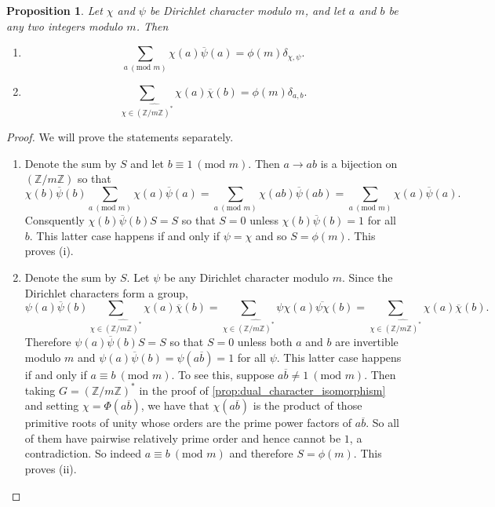 \documentclass[12pt]{book}
\newtheorem{proposition}{Proposition}[section]
\theoremstyle{definition}\newframedtheorem{method}{Method}
\newcommand{\tmod}[1]{\ \left(\text{mod }#1\right)}
\newcommand{\Z}{\mathbb{Z}}
\renewcommand{\d}{\delta}
\newcommand{\<}{\langle}
\renewcommand{\>}{\rangle}
\newcommand{\what}{\widehat}
\newcommand{\conj}{\overline}
\newcommand{\cchi}{\conj{\chi}}
\begin{document}
    \begin{proposition}\label{prop:Dirichlet_orthogonality_relations}
      Let $\chi$ and $\psi$ be Dirichlet character modulo $m$, and let $a$ and $b$ be any two integers modulo $m$. Then
      \begin{enumerate}[label=(\roman*)]
        \item
        \[
          \sum_{a \tmod{m}}\chi(a)\conj{\psi}(a) = \phi(m)\d_{\chi,\psi}.
        \]
        \item
        \[
          \sum_{\chi \in \what{(\Z/m\Z)^{\ast}}}\chi(a)\cchi(b) = \phi(m)\d_{a,b}.
        \]
      \end{enumerate}
    \end{proposition}
    \begin{proof}
      We will prove the statements separately.
      \begin{enumerate}[label=(\roman*)]
        \item Denote the sum by $S$ and let $b \equiv 1 \tmod{m}$. Then $a \to ab$ is a bijection on $(\Z/m\Z)$ so that
        \[
          \chi(b)\conj{\psi}(b)\sum_{a \tmod{m}}\chi(a)\conj{\psi}(a) = \sum_{a \tmod{m}}\chi(ab)\conj{\psi}(ab) = \sum_{a \tmod{m}}\chi(a)\conj{\psi}(a).
        \]
        Consquently $\chi(b)\conj{\psi}(b)S = S$ so that $S = 0$ unless $\chi(b)\conj{\psi}(b) = 1$ for all $b$. This latter case happens if and only if $\psi = \chi$ and so $S = \phi(m)$. This proves (i).
        \item Denote the sum by $S$. Let $\psi$ be any Dirichlet character modulo $m$. Since the Dirichlet characters form a group,
        \[
          \psi(a)\conj{\psi}(b)\sum_{\chi \in \what{(\Z/m\Z)^{\ast}}}\chi(a)\cchi(b) = \sum_{\chi \in \what{(\Z/m\Z)^{\ast}}}\psi\chi(a)\conj{\psi\chi}(b) = \sum_{\chi \in \what{(\Z/m\Z)^{\ast}}}\chi(a)\cchi(b).
        \]
        Therefore $\psi(a)\conj{\psi}(b)S = S$ so that $S = 0$ unless both $a$ and $b$ are invertible modulo $m$ and $\psi(a)\conj{\psi}(b) = \psi(a\conj{b}) = 1$ for all $\psi$. This latter case happens if and only if $a \equiv b \tmod{m}$. To see this, suppose $a\conj{b} \neq 1 \tmod{m}$. Then taking $G = (\Z/m\Z)^{\ast}$ in the proof of \cref{prop:dual_character_isomorphism} and setting $\chi = \Phi(a\conj{b})$, we have that $\chi(a\conj{b})$ is the product of those primitive roots of unity whose orders are the prime power factors of $a\conj{b}$. So all of them have pairwise relatively prime order and hence cannot be $1$, a contradiction. So indeed $a \equiv b \tmod{m}$ and therefore $S = \phi(m)$. This proves (ii).
      \end{enumerate}
    \end{proof}
\end{document}
